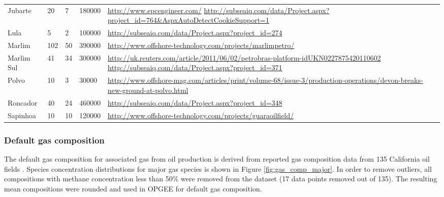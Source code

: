 \documentclass[11pt]{report}
\newcommand{\marg}[1]{{\footnotesize\textit{\textcolor{stanford}{'#1'}}}}
\newcommand{\marginnote}[1]{\marginpar{\marg{#1}}}
\begin{document}
\begin{landscape}
\begin{table}
\begin{scriptsize}
\begin{tabular*}{1\columnwidth}{p{}p{}p{}p{}p{}}
Jubarte &20 &7 &180000 &\url{http://www.epcengineer.com/}
\url{http://subseaiq.com/data/Project.aspx?project_id=764&AspxAutoDetectCookieSupport=1} \\
Lula &5 &2 &100000 &\url{http://subseaiq.com/data/Project.aspx?project_id=274} \\
Marlim &102 &50 &390000 &\url{http://www.offshore-technology.com/projects/marlimpetro/} \\
Marlim Sul &41 &34 &300000 &\url{http://uk.reuters.com/article/2011/06/02/petrobras-platform-idUKN0227875420110602} 
\url{http://subseaiq.com/data/Project.aspx?project_id=371} \\
Polvo &10 &3 &30000 &\url{http://www.offshore-mag.com/articles/print/volume-68/issue-3/production-operations/devon-breaks-new-ground-at-polvo.html} \\
Roncador &40 &24 &460000 & \url{http://subseaiq.com/data/Project.aspx?project_id=348} \\
Sapinhoa &10 &10 &120000 & \url{http://www.offshore-technology.com/projects/guaraoilfield/} \\
\bottomrule
\end{tabular*}
\end{scriptsize}
\end{table}
\end{landscape}



\subsubsection{Default gas composition}

The default gas composition for associated gas from oil production is derived from reported gas composition data from 135 California oil fields \cite{Lee2011}. Species concentration distributions for major gas species is shown in Figure \ref{fig:gas_comp_major}. In order to remove outliers, all compositions with methane concentration less than 50\% were removed from the dataset (17 data points removed out of 135). \marginnote{Active Field 2.3.2}The resulting mean compositions were rounded and used in OPGEE for default gas composition.
\end{document}
